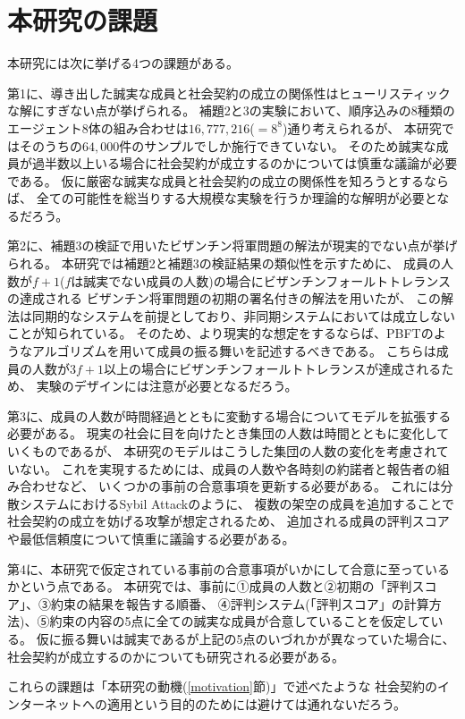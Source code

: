 \section{本研究の課題}
本研究には次に挙げる4つの課題がある。

第1に、導き出した誠実な成員と社会契約の成立の関係性はヒューリスティックな解にすぎない点が挙げられる。
補題2と3の実験において、順序込みの8種類のエージェント8体の組み合わせは$16,777,216$($=8^8$)通り考えられるが、
本研究ではそのうちの$64,000$件のサンプルでしか施行できていない。
そのため誠実な成員が過半数以上いる場合に社会契約が成立するのかについては慎重な議論が必要である。
仮に厳密な誠実な成員と社会契約の成立の関係性を知ろうとするならば、
全ての可能性を総当りする大規模な実験を行うか理論的な解明が必要となるだろう。

第2に、補題3の検証で用いたビザンチン将軍問題の解法が現実的でない点が挙げられる。
本研究では補題2と補題3の検証結果の類似性を示すために、
成員の人数が$f+1$($f$は誠実でない成員の人数)の場合にビザンチンフォールトトレランスの達成される
ビザンチン将軍問題の初期の署名付きの解法\cite{lamport1982}を用いたが、
この解法は同期的なシステムを前提としており、非同期システムにおいては成立しないことが知られている。\cite{fischer1985}
そのため、より現実的な想定をするならば、PBFTのようなアルゴリズムを用いて成員の振る舞いを記述するべきである。\cite{castro1999}
こちらは成員の人数が$3f+1$以上の場合にビザンチンフォールトトレランスが達成されるため、
実験のデザインには注意が必要となるだろう。

第3に、成員の人数が時間経過とともに変動する場合についてモデルを拡張する必要がある。
現実の社会に目を向けたとき集団の人数は時間とともに変化していくものであるが、
本研究のモデルはこうした集団の人数の変化を考慮されていない。
これを実現するためには、成員の人数や各時刻の約諾者と報告者の組み合わせなど、
いくつかの事前の合意事項を更新する必要がある。
これには分散システムにおけるSybil Attack\cite{douceur2002}のように、
複数の架空の成員を追加することで社会契約の成立を妨げる攻撃が想定されるため、
追加される成員の評判スコアや最低信頼度について慎重に議論する必要がある。

第4に、本研究で仮定されている事前の合意事項がいかにして合意に至っているかという点である。
本研究では、事前に①成員の人数と②初期の「評判スコア」、③約束の結果を報告する順番、
④評判システム(「評判スコア」の計算方法)、⑤約束の内容の5点に全ての誠実な成員が合意していることを仮定している。
仮に振る舞いは誠実であるが上記の5点のいづれかが異なっていた場合に、社会契約が成立するのかについても研究される必要がある。

これらの課題は「本研究の動機(\ref{motivation}節)」で述べたような
社会契約のインターネットへの適用という目的のためには避けては通れないだろう。

